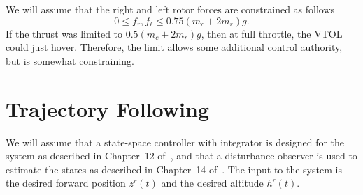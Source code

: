 \documentclass{article}
\begin{document}
We will assume that the right and left rotor forces are constrained as follows
\begin{equation}\label{eq:input_constraints}
	0\leq f_r, f_\ell \leq 0.75 (m_c + 2 m_r)g.
\end{equation}
If the thrust was limited to $0.5 (m_c + 2 m_r)g$, then at full throttle, the VTOL could just hover.  Therefore, the limit allows some additional control authority, but is somewhat constraining.

\section{Trajectory Following}

We will assume that a state-space controller with integrator is designed for the system as described in Chapter~12 of~\cite{BeardMcLainPeterson}, and that a disturbance observer is used to estimate the states as described in Chapter~14 of~\cite{BeardMcLainPeterson}.  The input to the system is the desired forward position $z^r(t)$ and the desired altitude $h^r(t)$.  




\end{document}
